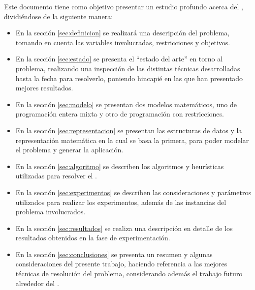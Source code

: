 Este documento tiene como objetivo presentar un estudio profundo acerca del \mrp, dividiéndose de la siguiente manera:
\begin{itemize}
	\item En la sección \ref{sec:definicion} se realizará una descripción del problema, tomando en cuenta las variables involucradas, restricciones y objetivos.
	\item En la sección \ref{sec:estado} se presenta el ``estado del arte'' en torno al problema, realizando una inspección de las distintas técnicas desarrolladas hasta la fecha para resolverlo, poniendo hincapié en las que han presentado mejores resultados. 
	\item En la sección \ref{sec:modelo} se presentan dos modelos matemáticos, uno de programación entera mixta y otro de programación con restricciones.
	\item En la sección \ref{sec:representacion} se presentan las estructuras de datos y la representación matemática en la cual se basa la primera, para poder modelar el problema y generar la aplicación.
	\item En la sección \ref{sec:algoritmo} se describen los algoritmos y heurísticas utilizadas para resolver el \mrp.
	\item En la sección \ref{sec:experimentos} se describen las consideraciones y parámetros utilizados para realizar los experimentos, además de las instancias del problema involucrados.
	\item En la sección \ref{sec:resultados} se realiza una descripción en detalle de los resultados obtenidos en la fase de experimentación.
	\item En la sección \ref{sec:conclusiones} se presenta un resumen y algunas consideraciones del presente trabajo, haciendo referencia a las mejores técnicas de resolución del problema, considerando además el trabajo futuro alrededor del \mrp.
\end{itemize}
  

